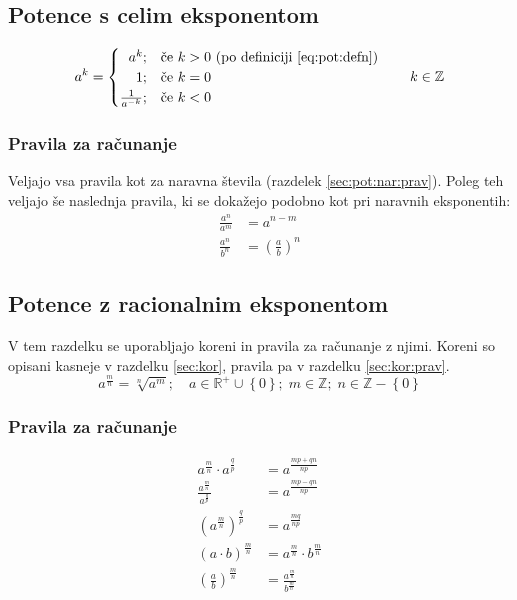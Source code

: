 \documentclass[a4paper,oneside,12pt,fleqn]{article}
\def\R{\ensuremath{\mathbb R}}
\def\Z{\ensuremath{\mathbb Z}}
\newcommand\krat\cdot
\numberwithin{equation}{section}
\begin{document}
\subsection{Potence s celim eksponentom}
\label{sec:pot:cela}
\begin{equation}
  \label{eq:pot:defz}
  a^k =
  \begin{cases}
    \hfill a^k; & \text{če $k > 0$ (po definiciji \eqref{eq:pot:defn})} \\
    \hfill 1;   & \text{če $k = 0$} \\
    \hfill \frac{1}{a^{-k}}; & \text{če $k < 0$}
  \end{cases}
  \qquad k \in \Z
\end{equation}


\subsubsection{Pravila za računanje}
\label{sec:pot:cela:prav}
Veljajo vsa pravila kot za naravna števila (razdelek \ref{sec:pot:nar:prav}). Poleg teh veljajo še
naslednja pravila, ki se dokažejo podobno kot pri naravnih eksponentih:
\begin{align}
  \frac{a^n}{a^m} &= a^{n-m} \label{eq:pot:anandelanam} \\
  \frac{a^n}{b^n} &= \left( \frac{a}{b} \right)^n
\end{align}

\subsection{Potence z racionalnim eksponentom}
\label{sec:pot:rac}
V tem razdelku se uporabljajo koreni in pravila za računanje z njimi. Koreni so opisani
kasneje v razdelku \ref{sec:kor}, pravila pa v razdelku \ref{sec:kor:prav}.
\begin{equation}
  \label{eq:pot:defrac}
  a^{\frac{m}{n}} = \sqrt[n]{a^m}; \quad a \in \R^+ \cup \left\{ 0 \right\}; \; m \in \Z;
  \; n \in \Z - \left\{ 0 \right\}
\end{equation}

\subsubsection{Pravila za računanje}
\label{sec:pot:rac:prav}
\begin{align}
  a^{\frac{m}{n}} \krat a^{\frac{q}{p}} &= a^{\frac{mp+qn}{np}} \label{eq:pot:rac:prav:prodpot} \\
  \frac{a^{\frac{m}{n}}}{a^{\frac{q}{p}}} &= a^{\frac{mp-qn}{np}} \label{eq:pot:rac:prav:kvocpot} \\
  \left( a^{\frac{m}{n}} \right)^{\frac{q}{p}} &= a^{\frac{mq}{np}} \label{eq:pot:rac:prav:potpot} \\
  \left( a \krat b \right)^{\frac{m}{n}} &= a^{\frac{m}{n}} \krat b^{\frac{m}{n}}
  \label{eq:pot:rac:prav:potprod} \\
  \left( \frac{a}{b} \right)^{\frac{m}{n}} &= \frac{a^{\frac{m}{n}}}{b^{\frac{m}{n}}}
  \label{eq:pot:rac:prav:potkvoc} \\
\end{align}
\end{document}
